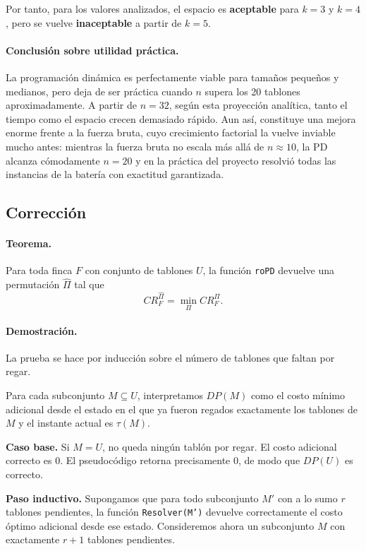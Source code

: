 \documentclass[12pt,a4paper]{article}
\begin{document}
Por tanto, para los valores analizados, el espacio es \textbf{aceptable} para \(k=3\) y \(k=4\), pero se vuelve \textbf{inaceptable} a partir de \(k=5\).

\paragraph{Conclusi\'on sobre utilidad pr\'actica.}
La programaci\'on din\'amica es perfectamente viable para tama\~nos peque\~nos y medianos, pero deja de ser pr\'actica cuando \(n\) supera los 20 tablones aproximadamente. A partir de \(n=32\), seg\'un esta proyecci\'on anal\'itica, tanto el tiempo como el espacio crecen demasiado r\'apido. Aun as\'i, constituye una mejora enorme frente a la fuerza bruta, cuyo crecimiento factorial la vuelve inviable mucho antes: mientras la fuerza bruta no escala m\'as all\'a de \(n \approx 10\), la PD alcanza c\'omodamente \(n = 20\) y en la pr\'actica del proyecto resolvi\'o todas las instancias de la bater\'ia con exactitud garantizada.

\subsection{Correcci\'on}

\paragraph{Teorema.}
Para toda finca \(F\) con conjunto de tablones \(U\), la funci\'on \texttt{roPD} devuelve una permutaci\'on \(\widehat{\Pi}\) tal que
\[
CR_F^{\widehat{\Pi}}=\min_{\Pi} CR_F^\Pi.
\]

\paragraph{Demostraci\'on.}
La prueba se hace por inducci\'on sobre el n\'umero de tablones que faltan por regar.

Para cada subconjunto \(M \subseteq U\), interpretamos \(DP(M)\) como el costo m\'inimo adicional desde el estado en el que ya fueron regados exactamente los tablones de \(M\) y el instante actual es \(\tau(M)\).

\textbf{Caso base.} Si \(M=U\), no queda ning\'un tabl\'on por regar. El costo adicional correcto es \(0\). El pseudoc\'odigo retorna precisamente \(0\), de modo que \(DP(U)\) es correcto.

\textbf{Paso inductivo.} Supongamos que para todo subconjunto \(M'\) con a lo sumo \(r\) tablones pendientes, la funci\'on \texttt{Resolver(M')} devuelve correctamente el costo \'optimo adicional desde ese estado. Consideremos ahora un subconjunto \(M\) con exactamente \(r+1\) tablones pendientes.
\end{document}

